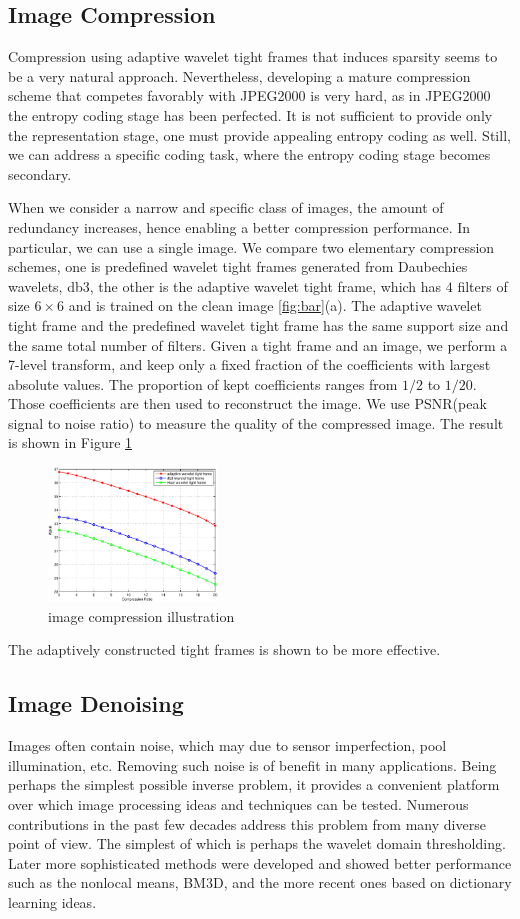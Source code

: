 \documentclass[a4paper]{article}
\begin{document}
\subsection{Image Compression}
Compression using adaptive wavelet tight frames that induces sparsity seems to be a very natural approach. Nevertheless, developing a mature compression scheme that competes favorably with JPEG2000 is very hard, as in JPEG2000 the entropy coding stage has been perfected. It is not sufficient to provide only the representation stage, one must provide appealing entropy coding as well. Still, we can address a specific coding task, where the entropy coding stage becomes secondary. 

When we consider a narrow and specific class of images, the amount of redundancy increases, hence enabling a better compression performance. In particular, we can use a single image. We compare two elementary compression schemes, one is predefined wavelet tight frames generated from Daubechies wavelets, db3, the other is the adaptive wavelet tight frame, which has $4$ filters of size $6\times 6$ and is trained on the clean image \ref{fig:bar}(a).  The adaptive wavelet tight frame and the predefined wavelet tight frame has the same support size and the same total number of filters.  Given a tight frame and an image, we perform a 7-level transform, and keep only a fixed fraction of the coefficients with largest absolute values. The proportion of kept coefficients ranges from $1/2$ to $1/20$. Those coefficients are then used to reconstruct the image. We use PSNR(peak signal to noise ratio) to measure the quality of the compressed image. The result is shown in Figure \ref{fig:3}
\begin{figure}[h!]
    \centering
    \includegraphics[width=0.4\textwidth]{figure51.eps}
    \caption{image compression illustration}
    \label{fig:3}
\end{figure}
The adaptively constructed tight frames is shown to be more effective.
\subsection{Image Denoising}
Images often contain noise, which may due to sensor imperfection, pool illumination, etc. Removing such noise is of benefit in many applications. Being perhaps the simplest possible inverse problem, it provides a convenient platform over which image processing ideas and techniques can be tested. Numerous contributions in the past few decades address this problem from many diverse point of view. The simplest of which is perhaps the wavelet domain thresholding. Later more sophisticated methods were developed and showed better performance such as the nonlocal means\cite{buades2005non}, BM3D\cite{dabov2007image}, and the more recent ones based on dictionary learning ideas\cite{elad2006image}. 
\end{document}

